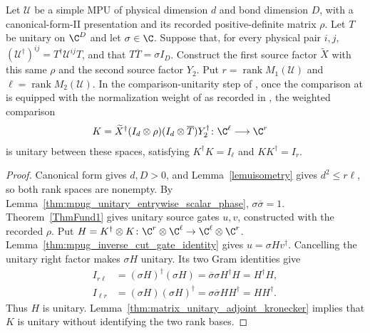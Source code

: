 \begin{lemma}
    \label{thm:mpug_inverse_cut_comparison_unitary}
    \leanok
    Let $\mathcal U$ be a simple MPU of physical dimension $d$ and bond
    dimension $D$, with a canonical-form-II presentation and its recorded
    positive-definite matrix $\rho$. Let $T$ be unitary on $\C^D$ and
    let $\sigma\in\C$. Suppose that, for every physical pair $i,j$,
    $(\mathcal U^\dagger)^{ij}=T^\dagger\mathcal U^{ij}T$, and that
    $T\overline T=\sigma I_D$. Construct the first source factor
    $\widetilde X$ with this same $\rho$ and the second source factor $Y_2$.
    Put $r=\operatorname{rank}M_1(\mathcal U)$ and
    $\ell=\operatorname{rank}M_2(\mathcal U)$. In the comparison-unitarity step
    of \cite[lines~5444--5487]{FrancoRubio2025MPUGauging}, once the comparison
    at \cite[lines~5436--5439]{FrancoRubio2025MPUGauging} is equipped with the
    normalization weight of \cite[lines~487--494]{Cirac2017MPU} as recorded in
    \cite{gap:fbc25_inverse_compatible_tilde_omission}, the weighted comparison
    \begin{align}
        K & =\widetilde X^\dagger(I_d\otimes\rho)
        (I_d\otimes\overline T)Y_2^\dagger
        \colon\C^\ell\longrightarrow\C^r
    \end{align}
    is unitary between these spaces, satisfying $K^\dagger K=I_\ell$ and
    $KK^\dagger=I_r$.
\end{lemma}
\begin{proof}\leanok
    Canonical form gives $d,D>0$, and Lemma~\ref{lemuisometry} gives
    $d^2\leq r\ell$, so both rank spaces are nonempty. By
    Lemma~\ref{thm:mpug_unitary_entrywise_scalar_phase},
    $\sigma\overline\sigma=1$. Theorem~\ref{ThmFund1} gives unitary
    source gates $u,v$, constructed with the recorded $\rho$. Put
    $H=K^\dagger\otimes K\colon\C^r\otimes\C^\ell
        \to\C^\ell\otimes\C^r$.
    Lemma~\ref{thm:mpug_inverse_cut_gate_identity} gives
    $u=\sigma Hv^\dagger$. Cancelling the unitary right factor makes
    $\sigma H$ unitary. Its two Gram identities give
    \begin{align}
        I_{r\ell}  & =(\sigma H)^\dagger(\sigma H)
        =\overline\sigma\sigma H^\dagger H=H^\dagger H, \\
        I_{\ell r} & =(\sigma H)(\sigma H)^\dagger
        =\sigma\overline\sigma HH^\dagger=HH^\dagger.
    \end{align}
    Thus $H$ is unitary. Lemma~\ref{thm:matrix_unitary_adjoint_kronecker}
    implies that $K$ is unitary without identifying the two rank bases.
\end{proof}

